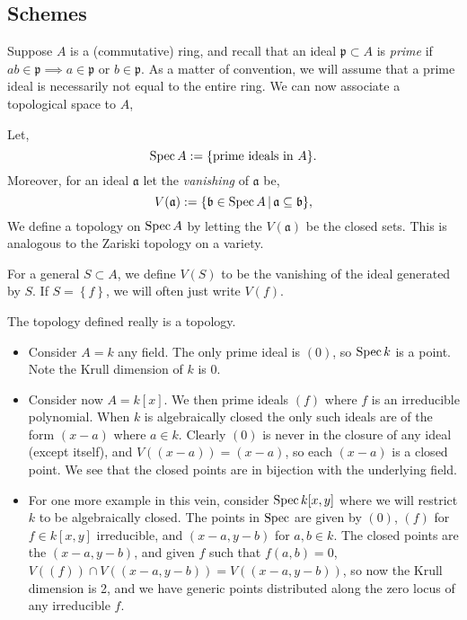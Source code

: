 \documentclass[000-main.tex]{subfiles}
\begin{document}
\subsection{Schemes}%
\label{sec:schemes}

Suppose $A$ is a (commutative) ring, and recall that an ideal $\mathfrak{p}\subset A$ is \emph{prime} if $ab\in\mathfrak{p}\implies a\in \mathfrak{p}$ or $b\in\mathfrak{p}$.
As a matter of convention, we will assume that a prime ideal is necessarily not equal to the entire ring.
We can now associate a topological space to $A$,
\begin{definition}
  Let,
  \[
	\operatorname{Spec} A := \lbrace\text{prime ideals in }A\rbrace.
  \]
  Moreover, for an ideal $\mathfrak{a}$ let the \emph{vanishing} of $\mathfrak{a}$ be,
  \[
	V(\mathfrak{a}) := \lbrace\mathfrak{b} \in \operatorname{Spec} A \, | \, \mathfrak{a} \subseteq \mathfrak{b} \rbrace,
  \]
  We define a topology on $\operatorname{Spec} A$ by letting the $V(\mathfrak{a})$ be the closed sets.
  This is analogous to the Zariski topology on a variety.
\end{definition}
For a general $S\subset A$, we define $V(S)$ to be the vanishing of the ideal generated by $S$.
If $S = \left\{ f \right\}$, we will often just write $V(f)$.

\begin{lemma}
  The topology defined really is a topology.
\end{lemma} 

\begin{example}
  \begin{itemize}
    \item Consider $A = k$ any field.
    The only prime ideal is $(0)$, so $\operatorname{Spec} k$ is a point.
    Note the Krull dimension of $k$ is 0.
    \item Consider now $A = k[x]$.
    We then prime ideals $(f)$ where $f$ is an irreducible polynomial.
    When $k$ is algebraically closed the only such ideals are of the form $(x-a)$ where $a \in k$.
    Clearly $(0)$ is never in the closure of any ideal (except itself), and $V((x-a)) = (x-a)$, so each $(x-a)$ is a closed point.
    We see that the closed points are in bijection with the underlying field.
    \item For one more example in this vein, consider $\operatorname{Spec} k[x, y]$ where we will restrict $k$ to be algebraically closed.
    The points in $\operatorname{Spec}$ are given by $(0)$, $(f)$ for $f \in k[x, y]$ irreducible, and $(x-a, y-b)$ for $a,b \in k$.
    The closed points are the $(x-a, y-b)$, and given $f$ such that $f(a,b)=0$, $V((f)) \cap V((x-a, y-b)) = V((x-a, y-b))$, so now the Krull dimension is 2, and we have generic points distributed along the zero locus of any irreducible $f$.
  \end{itemize}
\end{example}
\end{document}
